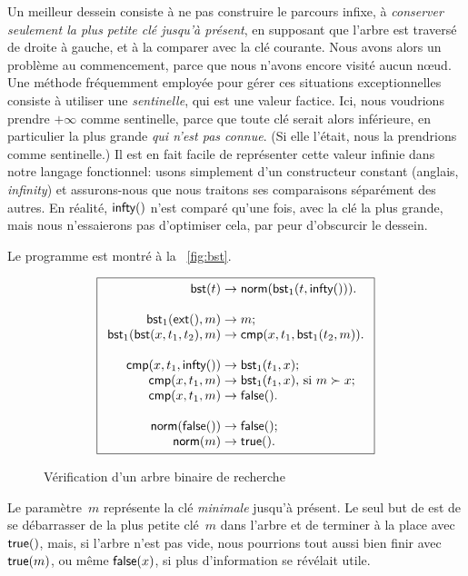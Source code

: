Un meilleur dessein consiste à ne pas construire le parcours infixe, à
\emph{conserver seulement la plus petite clé jusqu'à présent}, en
supposant que l'arbre est traversé de droite à gauche, et à la
comparer avec la clé courante. Nous avons alors un problème au
commencement, parce que nous n'avons encore visité aucun n{\oe}ud. Une
méthode fréquemment employée pour gérer ces situations exceptionnelles
consiste à utiliser une \emph{sentinelle}, qui est
une valeur factice. Ici, nous voudrions prendre \(+\infty\) comme
sentinelle, parce que toute clé serait alors inférieure, en
particulier la plus grande \emph{qui n'est pas connue}. (Si elle
l'était, nous la prendrions comme sentinelle.) Il est en fait facile
de représenter cette valeur infinie dans notre langage fonctionnel:
usons simplement d'un constructeur constant
 (anglais, \emph{infinity}) et
assurons-nous que nous traitons ses comparaisons séparément des
autres. En réalité, \(\textsf{infty}()\) n'est
comparé qu'une fois, avec la clé la plus grande, mais nous
n'essaierons pas d'optimiser cela, par peur d'obscurcir le dessein.

Le programme est montré à la
\fig~\vref{fig:bst}.
\begin{figure}[t]
\begin{equation*}
\boxed{
\begin{array}{r@{\;}l@{\;}l}
  \fun{bst}(t) & \rightarrow & \fun{norm}(\fun{bst}_1(t,\fun{infty}())).\\
  \\
  \fun{bst}_1(\fun{ext}(),m) & \rightarrow & m;\\
  \fun{bst}_1(\fun{bst}(x,t_1,t_2),m) & \rightarrow &
  \fun{cmp}(x,t_1,\fun{bst}_1(t_2,m)).\\
\\
\fun{cmp}(x,t_1,\fun{infty}()) & \rightarrow & \fun{bst}_1(t_1,x);\\
\fun{cmp}(x,t_1,m) & \rightarrow &
  \fun{bst}_1(t_1,x), \,\text{si \(m \succ x\)};\\
\fun{cmp}(x,t_1,m) & \rightarrow & \fun{false}().\\
\\
\fun{norm}(\fun{false}()) & \rightarrow & \fun{false}();\\
\fun{norm}(m) & \rightarrow & \fun{true}().
\end{array}}
\end{equation*}
\caption{Vérification d'un arbre binaire de recherche}
\label{fig:bst}
\end{figure}
Le paramètre~\(m\) représente la clé \emph{minimale} jusqu'à
présent. Le seul but de  est de
se débarrasser de la plus petite clé~\(m\) dans l'arbre et de terminer
à la place avec \(\textsf{true}()\), mais, si l'arbre n'est pas vide,
nous pourrions tout aussi bien finir avec \(\textsf{true}(m)\), ou même
\(\textsf{false}(x)\), si plus d'information se révélait
utile.

